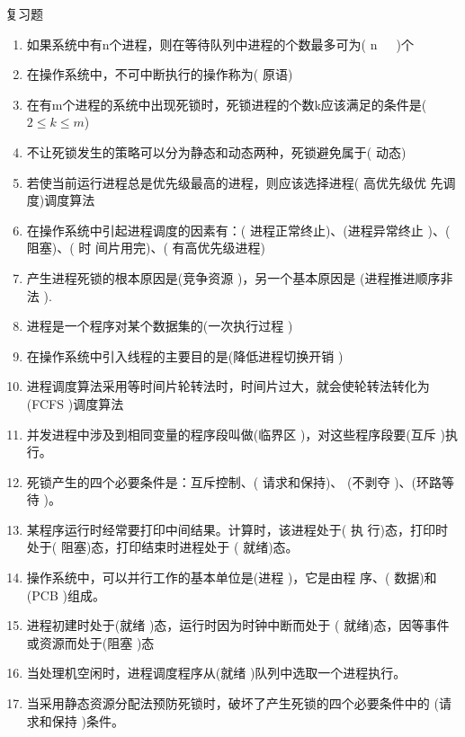 \begin{frame}{复习题}
  \begin{enumerate}
  \item 如果系统中有n个进程，则在等待队列中进程的个数最多可为( {\color{white}n~~~})个
  \item 在操作系统中，不可中断执行的操作称为( {\color{white}原语})
  \item 在有m个进程的系统中出现死锁时，死锁进程的个数k应该满足的条件是(
    {\color{white}$2 \leq k \leq m$})
  \item 不让死锁发生的策略可以分为静态和动态两种，死锁避免属于( {\color{white}
      动态})
  \item 若使当前运行进程总是优先级最高的进程，则应该选择进程( {\color{white}高优先级优
      先调度})调度算法
  \item 在操作系统中引起进程调度的因素有：( {\color{white}进程正常终止})、({\color{white}进程异常终止 })、({\color{white} 阻塞})、({\color{white} 时
      间片用完})、({\color{white} 有高优先级进程})
  \item 产生进程死锁的根本原因是({\color{white}竞争资源 })，另一个基本原因是
    ({\color{white}进程推进顺序非法 }).
  \item 进程是一个程序对某个数据集的({\color{white}一次执行过程 })
  \item 在操作系统中引入线程的主要目的是({\color{white}降低进程切换开销 })
  \item 进程调度算法采用等时间片轮转法时，时间片过大，就会使轮转法转化为({\color{white}FCFS })调度算法
  \item 并发进程中涉及到相同变量的程序段叫做({\color{white}临界区 })，对这些程序段要({\color{white}互斥 })执行。
  \item 死锁产生的四个必要条件是：互斥控制、({\color{white} }请求和保持)、
    ({\color{white}不剥夺 })、({\color{white}环路等待 })。
  \item 某程序运行时经常要打印中间结果。计算时，该进程处于({\color{white} 执
      行})态，打印时处于({\color{white} 阻塞})态，打印结束时进程处于
    ({\color{white} 就绪})态。
  \item 操作系统中，可以并行工作的基本单位是({\color{white}进程 })，它是由程
    序、({\color{white} 数据})和({\color{white}PCB })组成。
  \item 进程初建时处于({\color{white}就绪 })态，运行时因为时钟中断而处于
    ({\color{white} 就绪})态，因等事件或资源而处于({\color{white}阻塞 })态
  \item 当处理机空闲时，进程调度程序从({\color{white}就绪 })队列中选取一个进程执行。
  \item 当采用静态资源分配法预防死锁时，破坏了产生死锁的四个必要条件中的
    ({\color{white}请求和保持 })条件。
  \end{enumerate}
\end{frame}


